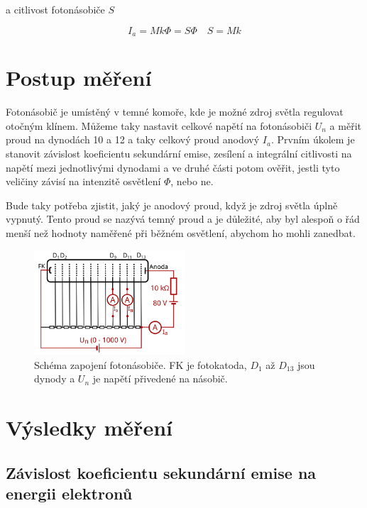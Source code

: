 \documentclass[a4paper,11pt]{article}
\begin{document}
\noindent
a citlivost fotonásobiče $ S $ 

\begin{equation}
I_a = M k \Phi = S \Phi \quad S = M k
\end{equation}

 
\section{Postup měření}

Fotonásobič je umístěný v temné komoře, kde je možné zdroj světla regulovat otočným klínem. Můžeme taky nastavit celkové napětí na fotonásobiči $ U_n $ a měřit proud na dynodách 10 a 12 a taky celkový proud anodový $ I_a $.
Prvním úkolem je stanovit závislost koeficientu sekundární emise, zesílení a integrální citlivosti na napětí mezi jednotlivými dynodami a ve druhé části potom ověřit, jestli tyto veličiny závisí na intenzitě osvětlení $ \Phi $, nebo ne.

Bude taky potřeba zjistit, jaký je anodový proud, když je zdroj světla úplně vypnutý. Tento proud se nazývá temný proud a je důležité, aby byl alespoň o řád menší než hodnoty naměřené při běžném osvětlení, abychom ho mohli zanedbat.

\begin{figure}[htpb]
    \centering
    \includegraphics[width=0.5\textwidth]{fotonasobic.png}
    \caption{Schéma zapojení fotonásobiče. FK je fotokatoda, $ D_1 $ až $ D_{13} $ jsou dynody a $ U_n $ je napětí přivedené na násobič. }
\end{figure}

\newpage

\section{Výsledky měření}

\subsection{Závislost koeficientu sekundární emise na energii elektronů}
\end{document}
